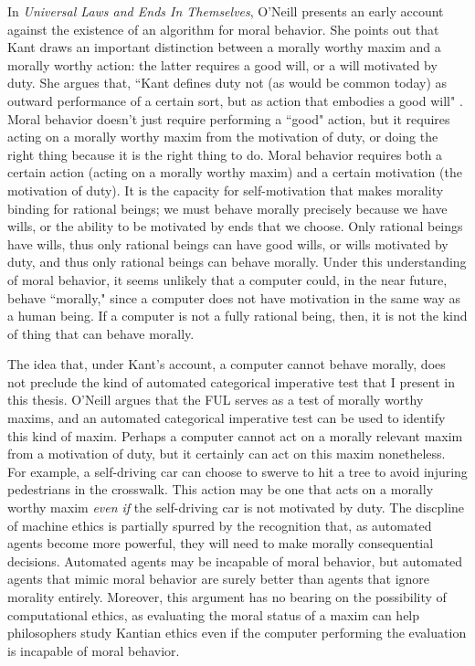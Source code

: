 \begin{isabellebody}
\begin{isamarkuptext}
In \emph{Universal Laws and Ends In Themselves}, O'Neill presents an early account against the existence of an algorithm for
moral behavior. She points out that Kant draws an important distinction between a morally worthy maxim
and a morally worthy action: the latter requires a good will, or a will motivated by duty. She argues that, 
``Kant defines duty not (as would be common today) as outward performance of a certain sort, but as action
that embodies a good will" \citep[345]{oneilluniversallaws}. Moral behavior doesn't just require performing
a ``good" action, but it requires acting on a morally worthy maxim from the motivation of duty, or 
doing the right thing because it is the right thing to do. Moral behavior requires both a certain action 
(acting on a morally worthy maxim) and a certain motivation (the motivation of duty). It is the capacity 
for self-motivation that makes morality binding for rational beings; we must behave morally precisely 
because we have wills, or the ability to be motivated by ends
that we choose. Only rational beings have wills, thus only rational beings can have good wills, or wills
motivated by duty, and thus only rational beings can behave morally. Under this understanding
of moral behavior, it seems unlikely that a computer could, in the near future, behave ``morally," 
since a computer does not have motivation in the same way as a human being. If a computer is not a fully rational
being, then, it is not the kind of thing that can behave morally.

The idea that, under Kant's account, a computer cannot behave morally, does not preclude the kind 
of automated categorical imperative test that I present in this thesis. O'Neill argues that the FUL
serves as a test of morally worthy maxims, and an automated categorical imperative test can be used 
to identify this kind of maxim. Perhaps a computer cannot act on a morally relevant maxim from a motivation of duty, 
but it certainly can act on this maxim nonetheless. For example, a self-driving car can choose to swerve to hit a tree
to avoid injuring pedestrians in the crosswalk. This action may be one that acts on a morally worthy maxim
\emph{even if} the self-driving car is not motivated by duty. The discpline of machine ethics is partially
spurred by the recognition that, as automated agents become more powerful, they will need to make
morally consequential decisions. Automated agents may be incapable of moral behavior, but automated agents that mimic
moral behavior are surely better than agents that ignore morality entirely. Moreover, this argument
has no bearing on the possibility of computational ethics, as evaluating the moral status of a maxim can 
help philosophers study Kantian ethics even if the computer performing the evaluation is incapable of 
moral behavior.


\end{isamarkuptext}
\end{isabellebody}

